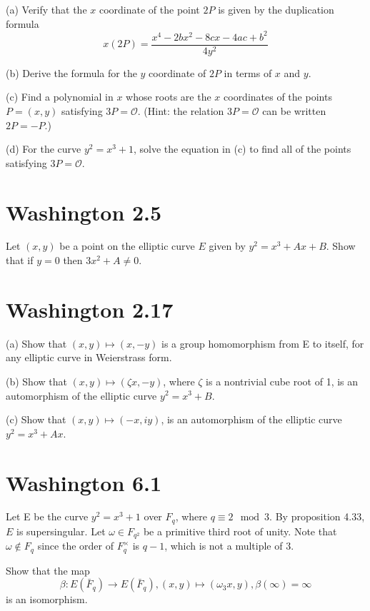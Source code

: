 \documentclass{article}
\begin{document}
(a) Verify that the $x$ coordinate of the point $2P$ is given by the duplication formula
$$x(2P) = \frac{x^4 - 2bx^2 - 8cx - 4ac + b^2}{4y^2}$$

(b) Derive the formula for the $y$ coordinate of $2P$ in terms of $x$ and $y$.

(c) Find a polynomial in $x$ whose roots are the $x$ coordinates of the points $P=(x,y)$ satisfying $3P=\mathcal{O}$. (Hint: the relation $3P = \mathcal{O}$ can be written $2P = -P$.)

(d) For the curve $y^2 = x^3 + 1$, solve the equation in (c) to find all of the points satisfying $3P = \mathcal{O}$.

\section{Washington 2.5}
Let $(x,y)$ be a point on the elliptic curve $E$ given by $y^2 = x^3 + Ax + B$. Show that if $y = 0$ then $3x^2 + A \neq 0$. 

\section{Washington 2.17}
(a) Show that $(x,y) \mapsto (x,−y)$ is a group homomorphism from E to itself, for any elliptic curve in Weierstrass form.

(b) Show that $(x,y) \mapsto (\zeta x,−y)$, where $\zeta$ is a nontrivial cube root of 1, is an automorphism of the elliptic curve $y^2 = x^3 + B$.

(c) Show that $(x, y) \mapsto (−x, iy)$, is an automorphism of the elliptic curve $y^2 = x^3 + Ax$.

\section{Washington 6.1}
Let E be the curve $y^2 = x^3+1$ over $F_q$, where $q \equiv 2 \mod 3$. By proposition 4.33, $E$ is supersingular. Let $\omega \in F_{q^2}$ be a primitive third root of unity. Note that $\omega \not \in F_q$ since the order of $F_q^\times$ is $q−1$, which is not a multiple of $3$.

Show that the map
$$\beta: E(\bar F_q) \to E(\bar F_q), (x,y) \mapsto (\omega_3 x, y), \beta(\infty) = \infty$$
is an isomorphism.
\end{document}

